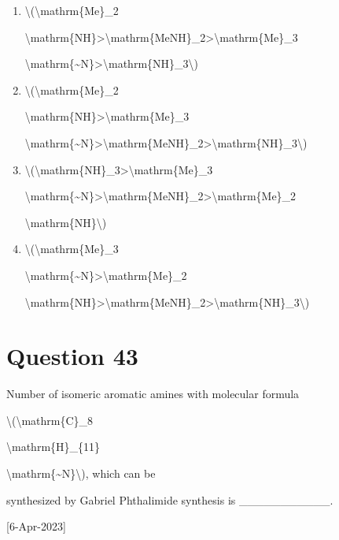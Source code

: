 \documentclass{article}
\begin{document}
\begin{enumerate}[label=(\alph*)]
\item \textbackslash(\textbackslash mathrm\{Me\}\_2

\textbackslash mathrm\{NH\}\textgreater\textbackslash mathrm\{MeNH\}\_2\textgreater\textbackslash mathrm\{Me\}\_3

\textbackslash mathrm\{\textasciitilde N\}\textgreater\textbackslash mathrm\{NH\}\_3\textbackslash)


\item \textbackslash(\textbackslash mathrm\{Me\}\_2

\textbackslash mathrm\{NH\}\textgreater\textbackslash mathrm\{Me\}\_3

\textbackslash mathrm\{\textasciitilde N\}\textgreater\textbackslash mathrm\{MeNH\}\_2\textgreater\textbackslash mathrm\{NH\}\_3\textbackslash)


\item \textbackslash(\textbackslash mathrm\{NH\}\_3\textgreater\textbackslash mathrm\{Me\}\_3

\textbackslash mathrm\{\textasciitilde N\}\textgreater\textbackslash mathrm\{MeNH\}\_2\textgreater\textbackslash mathrm\{Me\}\_2

\textbackslash mathrm\{NH\}\textbackslash)


\item \textbackslash(\textbackslash mathrm\{Me\}\_3

\textbackslash mathrm\{\textasciitilde N\}\textgreater\textbackslash mathrm\{Me\}\_2

\textbackslash mathrm\{NH\}\textgreater\textbackslash mathrm\{MeNH\}\_2\textgreater\textbackslash mathrm\{NH\}\_3\textbackslash)


\end{enumerate}
\newpage
\section*{Question 43}
Number of isomeric aromatic amines with molecular formula

\textbackslash(\textbackslash mathrm\{C\}\_8

\textbackslash mathrm\{H\}\_\{11\}

\textbackslash mathrm\{\textasciitilde N\}\textbackslash), which can be

synthesized by Gabriel Phthalimide synthesis is \_\_\_\_\_\_\_\_\_\_\_.~

{[}6-Apr-2023{]}


\begin{enumerate}[label=(\alph*)]
\end{enumerate}
\newpage
\end{document}
